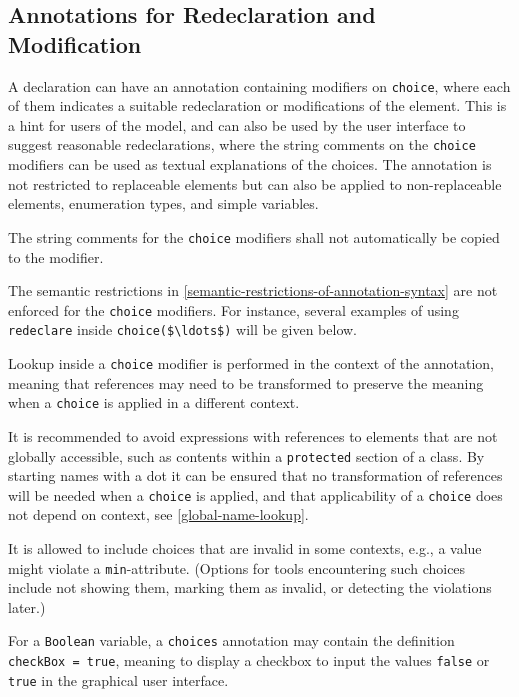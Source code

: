 \subsection{Annotations for Redeclaration and Modification}\label{annotation-choices-for-suggested-redeclarations-and-modifications}

A declaration can have an annotation  containing modifiers on \lstinline!choice!, where each of them indicates a suitable redeclaration or modifications of the element.
This is a hint for users of the model, and can also be used by the user interface to suggest reasonable redeclarations, where the string comments on the \lstinline!choice! modifiers can be used as textual explanations of the choices.
The annotation is not restricted to replaceable elements but can also be applied to non-replaceable elements, enumeration types, and simple variables.

The string comments for the \lstinline!choice! modifiers shall not automatically be copied to the modifier.

The semantic restrictions in \cref{semantic-restrictions-of-annotation-syntax} are not enforced for the \lstinline!choice! modifiers.
For instance, several examples of using \lstinline!redeclare! inside \lstinline!choice($\ldots$)! will be given below.

Lookup inside a \lstinline!choice! modifier is performed in the context of the annotation, meaning that references may need to be transformed to preserve the meaning when a \lstinline!choice! is applied in a different context.

\begin{nonnormative}
It is recommended to avoid expressions with references to elements that are not globally accessible, such as contents within a \lstinline!protected! section of a class.
By starting names with a dot it can be ensured that no transformation of references will be needed when a \lstinline!choice! is applied, and that applicability of a \lstinline!choice! does not depend on context, see \cref{global-name-lookup}.
\end{nonnormative}

It is allowed to include choices that are invalid in some contexts, e.g., a value might violate a \lstinline!min!-attribute.
(Options for tools encountering such choices include not showing them, marking them as invalid, or detecting the violations later.)

For a \lstinline!Boolean! variable, a \lstinline!choices! annotation may contain the definition \lstinline!checkBox = true!, meaning to display a checkbox to input the values \lstinline!false! or \lstinline!true! in the graphical user interface.

